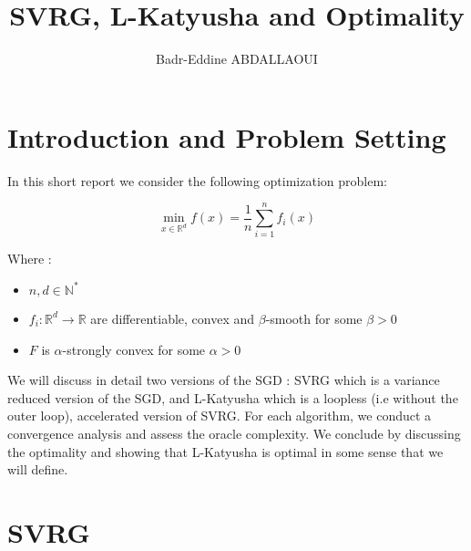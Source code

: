 \documentclass[12pt]{report}
\begin{document}
\title{SVRG, L-Katyusha and Optimality}

\author{Badr-Eddine ABDALLAOUI}

\maketitle


\newpage



\tableofcontents

\chapter{Introduction and Problem Setting}
In this short report we consider the following optimization problem:


\begin{equation} \label{pb1}
\boxed{\min_{x\in \mathbb{R}^d} f(x)=\frac{1}{n}\sum_{i=1}^nf_i(x)}
\end{equation}

Where :
\begin{itemize}
    \item $n,d \in\mathbb{N}^*$
    \item $f_i :\mathbb{R}^d\longrightarrow\mathbb{R}$ are differentiable, convex and $\beta$-smooth for some $\beta>0$
    \item $F$ is $\alpha$-strongly convex for some $\alpha>0$
\end{itemize}



We will discuss in detail two versions of the SGD : SVRG which is a variance reduced version of the SGD, and L-Katyusha which is a loopless (i.e without the outer loop), accelerated version of SVRG. For each algorithm, we conduct a convergence analysis and assess the oracle complexity. We conclude by discussing the optimality and showing that L-Katyusha is optimal in some sense that we will define. 

\chapter{SVRG}
\end{document}
